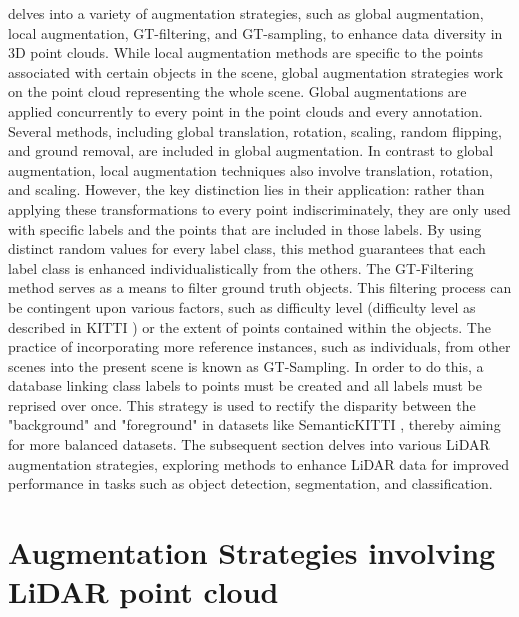 \parencite{DBLP:journals/corr/abs-2004-01643} delves into a variety of augmentation strategies, such as global augmentation, local augmentation, GT-filtering, and GT-sampling, to enhance data diversity in 3D point clouds. While local augmentation methods are specific to the points associated with certain objects in the scene, global augmentation strategies work on the point cloud representing the whole scene.
Global augmentations are applied concurrently to every point in the point clouds and every annotation. Several methods, including global translation, rotation, scaling, random flipping, and ground removal, are included in global augmentation. In contrast to global augmentation, local augmentation techniques also involve translation, rotation, and scaling. However, the key distinction lies in their application: rather than applying these transformations to every point indiscriminately, they are only used with specific labels and the points that are included in those labels. By using distinct random values for every label class, this method guarantees that each label class is enhanced individualistically from the others.
The GT-Filtering method serves as a means to filter ground truth objects. This filtering process can be contingent upon various factors, such as difficulty level (difficulty level as described in KITTI \parencite{Geiger2012CVPR}) or the extent of points contained within the objects. The practice of incorporating more reference instances, such as individuals, from other scenes into the present scene is known as GT-Sampling. In order to do this, a database linking class labels to points must be created and all labels must be reprised over once. This strategy is used to rectify the disparity between the "background" and "foreground" in datasets like SemanticKITTI \parencite{behley2019semantickitti}, thereby aiming for more balanced datasets. The subsequent section delves into various LiDAR augmentation strategies, exploring methods to enhance LiDAR data for improved performance in tasks such as object detection, segmentation, and classification.

\section{Augmentation Strategies involving LiDAR point cloud}

